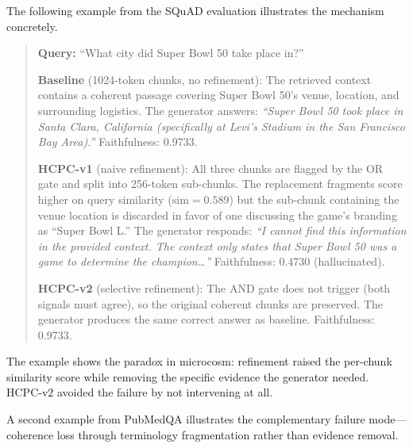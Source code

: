 The following example from the SQuAD evaluation illustrates the mechanism
concretely.

\begin{quote}
\small
\textbf{Query:} ``What city did Super Bowl 50 take place in?''

\textbf{Baseline} (1024-token chunks, no refinement): The retrieved context
contains a coherent passage covering Super Bowl 50's venue, location, and
surrounding logistics. The generator answers: \emph{``Super Bowl 50 took
place in Santa Clara, California (specifically at Levi's Stadium in the San
Francisco Bay Area).''} Faithfulness: 0.9733.

\textbf{HCPC-v1} (naive refinement): All three chunks are flagged by the OR
gate and split into 256-token sub-chunks. The replacement fragments score
higher on query similarity ($\text{sim} = 0.589$) but the sub-chunk
containing the venue location is discarded in favor of one discussing the
game's branding as ``Super Bowl L.'' The generator responds: \emph{``I
cannot find this information in the provided context. The context only states
that Super Bowl 50 was a game to determine the champion\ldots''}
Faithfulness: 0.4730 (hallucinated).

\textbf{HCPC-v2} (selective refinement): The AND gate does not trigger (both
signals must agree), so the original coherent chunks are preserved.
The generator produces the same correct answer as baseline. Faithfulness:
0.9733.
\end{quote}

\noindent The example shows the paradox in microcosm: refinement raised
the per-chunk similarity score while removing the specific evidence the
generator needed. HCPC-v2 avoided the failure by not intervening at all.

A second example from PubMedQA illustrates the complementary failure
mode---coherence loss through terminology fragmentation rather than
evidence removal.

